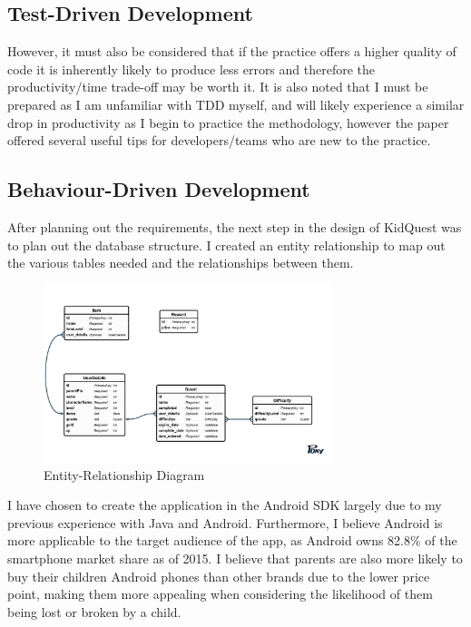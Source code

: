 \subsection{Test-Driven Development}

However, it must also be considered that if the practice offers a higher quality of code it is inherently likely to produce less errors and therefore the productivity/time trade-off may be worth it.
It is also noted that I must be prepared as I am unfamiliar with TDD myself, and will likely experience a similar drop in productivity as I begin to practice the methodology, however the paper offered several useful tips for developers/teams who are new to the practice.

\subsection{Behaviour-Driven Development}



After planning out the requirements, the next step in the design of KidQuest was to plan out the database structure.
I created an entity relationship to map out the various tables needed and the relationships between them.

\begin{figure}[t]
	\centering
	\includegraphics[width=0.75\textwidth]{images/entityRelationshipDiagram.png}
	\caption{Entity-Relationship Diagram}
	\label{fig:ERD}
\end{figure}

I have chosen to create the application in the Android SDK largely due to my previous experience with Java and Android. 
Furthermore, I believe Android is more applicable to the target audience of the app, as Android owns 82.8\% of the smartphone market share as of 2015.
I believe that parents are also more likely to buy their children Android phones than other brands due to the lower price point, making them more appealing when considering the likelihood of them being lost or broken by a child.

